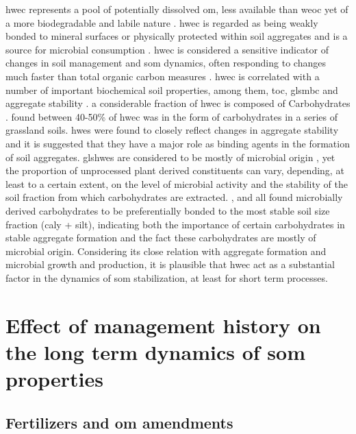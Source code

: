 	\gls{hwec} represents a pool of potentially dissolved \gls{om}, less available than \gls{weoc} yet of a more biodegradable and labile nature \citep{chantigny2014, leinweber1995, gregorich2003}. \gls{hwec} is regarded as being weakly bonded to mineral surfaces or physically protected within soil aggregates and is a source for microbial consumption \citep{zakharova2015, leinweber1995}.
	\gls{hwec} is considered a  sensitive indicator of changes in soil management and \gls{som} dynamics, often responding to changes much faster than total organic carbon measures \citep{ghani2003}. \gls{hwec} is correlated with a number of important biochemical soil properties, among them, \gls{toc}, gls{mbc} and aggregate stability \citep{hamkalo2014}.
	a considerable fraction of \gls{hwec} is composed of Carbohydrates \citep{leinweber1995, balaria2009}. \citet{ghani2003} found between 40-50\% of \gls{hwec} was in the form of carbohydrates in a series of grassland soils.
	\gls{hwes} were found to  closely reflect changes in aggregate stability \citep{haynes2005, yousefi2008, leguillou2012} and it is suggested that they have a major role as binding agents in the formation of soil aggregates.
	gls{hwes} are considered to be mostly of microbial origin \citep{haynes1993, debosz2002}, yet the proportion of unprocessed plant derived constituents can vary, depending, at least to a certain extent, on the level of microbial activity and the stability of the soil fraction from which carbohydrates are extracted. \citet{puget1998}, \citet{jolivet2006} and \citet{bock2007} all found microbially derived carbohydrates to be preferentially bonded to the most stable soil size fraction (caly + silt), indicating both the importance of certain  carbohydrates in stable aggregate formation and the fact these carbohydrates are mostly of microbial origin.
	Considering its close relation with aggregate formation and microbial growth and production, it is plausible that \gls{hwec} act as a substantial factor in  the dynamics of \gls{som} stabilization, at least for short term processes.

\section{Effect of management history on the long term dynamics of \gls{som} properties}

 	\subsection{Fertilizers and \gls{om} amendments}

